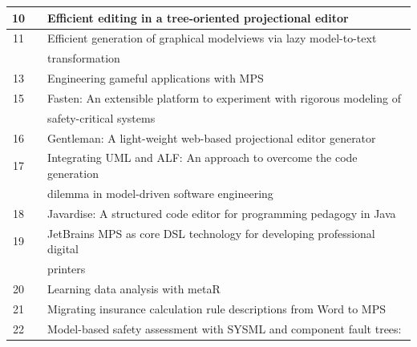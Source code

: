 \begin{table}
\begin{center}
\begin{tabular}{ |c  c|l | }
            10  & \cite{beckmann2020efficient_SLR}       & Efficient editing in a tree-oriented projectional editor                    \\ \hline
            11  & \cite{kolovos2020efficient_SLR}        & Efficient generation of graphical modelviews via lazy model-to-text         \\
                &                                        & transformation                                                              \\ \hline
            13  & \cite{bucchiarone2021engineering_SLR}  & Engineering gameful applications with MPS                                   \\ \hline
            15  & \cite{ratiu2021fasten_SLR}             & Fasten: An extensible platform to experiment with rigorous modeling of      \\
                &                                        & safety-critical systems                                                     \\ \hline
            16  & \cite{lafontant2020gentleman_SLR}      & Gentleman: A light-weight web-based projectional editor generator           \\ \hline
            17  & \cite{schropfer2019integrating_SLR}    & Integrating UML and ALF: An approach to overcome the code generation        \\
                &                                        & dilemma in model-driven software engineering                                \\ \hline
            18  & \cite{santos2020javardise_SLR}         & Javardise: A structured code editor for programming pedagogy in Java        \\ \hline
            19  & \cite{schindler2021jetbrains_SLR}      & JetBrains MPS as core DSL technology for developing professional digital    \\
                &                                        & printers                                                                    \\ \hline
            20  & \cite{simi2021learning_SLR}            & Learning data analysis with metaR                                           \\ \hline
            21  & \cite{stotz2021migrating_SLR}          & Migrating insurance calculation rule descriptions from Word to MPS          \\ \hline
            22  & \cite{munk2020model_SLR}               & Model-based safety assessment with SYSML and component fault trees:         \\

\end{tabular}
\end{center}
\end{table}
